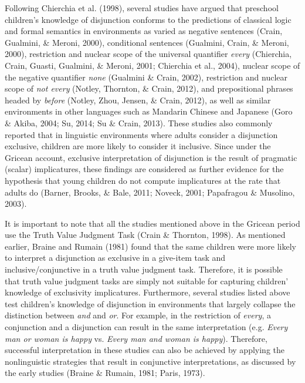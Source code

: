 \documentclass[floatsintext,man]{apa6}
\theoremstyle{definition}
\theoremstyle{definition}
\theoremstyle{definition}
\theoremstyle{remark}
\begin{document}
Following Chierchia et al. (1998), several studies have argued that
preschool children's knowledge of disjunction conforms to the
predictions of classical logic and formal semantics in environments as
varied as negative sentences (Crain, Gualmini, \& Meroni, 2000),
conditional sentences (Gualmini, Crain, \& Meroni, 2000), restriction
and nuclear scope of the universal quantifier \emph{every} (Chierchia,
Crain, Guasti, Gualmini, \& Meroni, 2001; Chierchia et al., 2004),
nuclear scope of the negative quantifier \emph{none} (Gualmini \& Crain,
2002), restriction and nuclear scope of \emph{not every} (Notley,
Thornton, \& Crain, 2012), and prepositional phrases headed by
\emph{before} (Notley, Zhou, Jensen, \& Crain, 2012), as well as similar
environments in other languages such as Mandarin Chinese and Japanese
(Goro \& Akiba, 2004; Su, 2014; Su \& Crain, 2013). These studies also
commonly reported that in linguistic environments where adults consider
a disjunction exclusive, children are more likely to consider it
inclusive. Since under the Gricean account, exclusive interpretation of
disjunction is the result of pragmatic (scalar) implicatures, these
findings are considered as further evidence for the hypothesis that
young children do not compute implicatures at the rate that adults do
(Barner, Brooks, \& Bale, 2011; Noveck, 2001; Papafragou \& Musolino,
2003).

It is important to note that all the studies mentioned above in the
Gricean period use the Truth Value Judgment Task (Crain \& Thornton,
1998). As mentioned earlier, Braine and Rumain (1981) found that the
same children were more likely to interpret a disjunction as exclusive
in a give-item task and inclusive/conjunctive in a truth value judgment
task. Therefore, it is possible that truth value judgment tasks are
simply not suitable for capturing children' knowledge of exclusivity
implicatures. Furthermore, several studies listed above test children's
knowledge of disjunction in environments that largely collapse the
distinction between \emph{and} and \emph{or}. For example, in the
restriction of \emph{every}, a conjunction and a disjunction can result
in the same interpretation (e.g. \emph{Every man or woman is happy} vs.
\emph{Every man and woman is happy}). Therefore, successful
interpretation in these studies can also be achieved by applying the
nonlinguistic strategies that result in conjunctive interpretations, as
discussed by the early studies (Braine \& Rumain, 1981; Paris, 1973).
\end{document}
